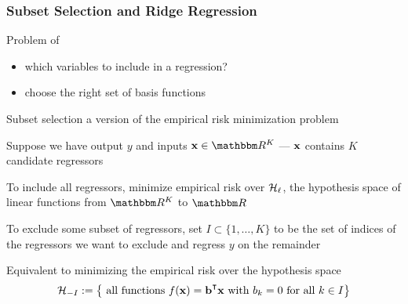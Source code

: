 \begin{frame}\frametitle{Subset Selection and Ridge Regression}

    Problem of 
    \begin{itemize}
        \item  which variables to
    include in a regression? 
        \item choose the right set of basis functions
    \end{itemize}
    
    Subset selection a version of the empirical risk minimization problem


\end{frame}

\begin{frame}
    
    \vspace{2em}
    Suppose we have output $y$ and inputs
    $\boldx \in \RR^K$ --- ${\mathbf x}$ contains $K$ candidate
    regressors
    
    To include all regressors, minimize
    empirical risk over $\mathcal{H}_{\ell}$, the hypothesis space of
    linear functions from $\RR^K$ to $\RR$
    
    \vspace{.7em}
    To exclude some subset of
    regressors, set $I \subset \{1,\ldots,K\}$ to be the set of indices of
    the regressors we want to exclude and regress $y$ on the remainder
    
    Equivalent to minimizing the empirical risk over the hypothesis space
    \begin{equation*}
        \hH_{-I} := \left\{
            \text{ all functions } 
                f(\boldx) = \boldb^\T \boldx
                \text{ with }
                b_k = 0 \text{ for all } k \in I
               \right\}
    \end{equation*}
    
\end{frame}

